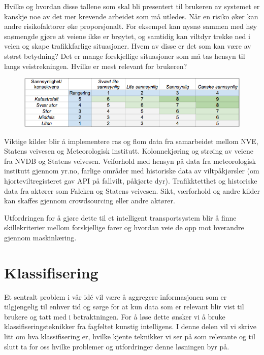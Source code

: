 \documentclass[a4paper,norsk,oneside]{book}
\begin{document}
Hvilke og hvordan disse tallene som skal bli presentert til brukeren av systemet er kanskje noe av det mer krevende arbeidet som må utledes. Når en risiko øker kan andre risikofaktorer øke proporsjonalt. For eksempel kan nysnø sammen med høy snømengde gjøre at veiene ikke er brøytet, og samtidig kan viltdyr trekke ned i veien og skape trafikkfarlige situasjoner. Hvem av disse er det som kan være av størst betydning? Det er mange forskjellige situasjoner som må tas hensyn til langs veistrekningen. Hvilke er mest relevant for brukeren?

\begin{figure}[H]
\centering
\includegraphics[scale=0.5]{figs/risiko2}
\label{fig:risiko2}
\end{figure}
\noindent
Viktige kilder blir å implementere ras og flom data fra samarbeidet mellom NVE, Statens veivesen og Meteorologisk institutt. Kolonnekjøring og strøing av veiene fra NVDB og Statens veivesen. Veiforhold med hensyn på data fra meteorologisk institutt gjennom yr.no, farlige områder med historiske data av viltpåkjørsler (om hjorteviltregisteret gav API på fallvilt, påkjørte dyr). Trafikktetthet og historiske data fra aktører som Falcken og Statens veivesen. Sikt, værforhold og andre kilder kan skaffes gjennom crowdsourcing eller andre aktører.

Utfordringen for å gjøre dette til et intelligent transportsystem blir å finne skillekriterier mellom forskjellige farer og hvordan veie de opp mot hverandre gjennom maskinlæring.

\section{Klassifisering}
\label{sec:klassifisering}

Et sentralt problem i vår idé vil være å aggregere informasjonen som er tilgjengelig til enhver tid og sørge for at kun data som er relevant blir vist til brukere og tatt med i betraktningen.  For å løse dette ønsker vi å bruke klassifiseringsteknikker fra fagfeltet kunstig intelligens. I denne delen vil vi skrive litt om hva klassifisering er, hvilke kjente teknikker vi ser på som relevante og til slutt ta for oss hvilke problemer og utfordringer denne løsningen byr på.
\end{document}
